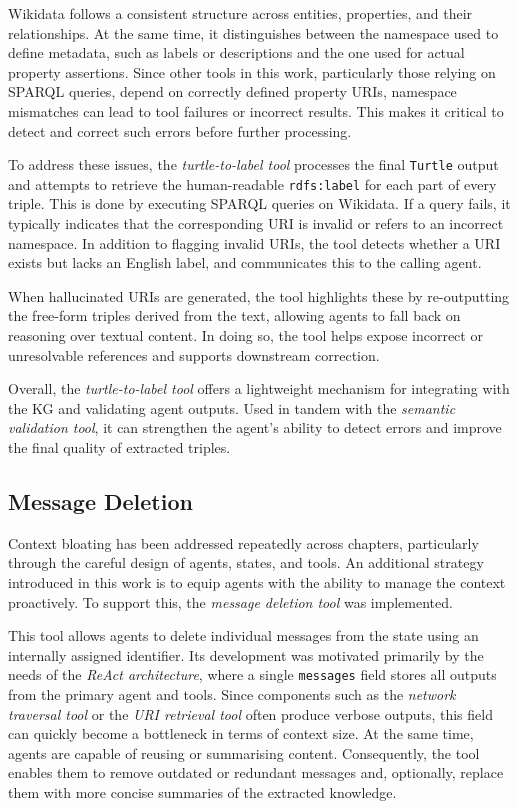 \documentclass[a4paper,oneside,bibliography=totoc]{scrbook}
\begin{document}
Wikidata follows a consistent structure across entities, properties, and their relationships. At the same time, it distinguishes between the namespace used to define metadata, such as labels or descriptions and the one used for actual property assertions. Since other tools in this work, particularly those relying on \ac{SPARQL} queries, depend on correctly defined property \acp{URI}, namespace mismatches can lead to tool failures or incorrect results. This makes it critical to detect and correct such errors before further processing.

To address these issues, the \textit{turtle-to-label tool} processes the final \texttt{Turtle} output and attempts to retrieve the human-readable \texttt{rdfs:label} for each part of every triple. This is done by executing \ac{SPARQL} queries on Wikidata. If a query fails, it typically indicates that the corresponding \ac{URI} is invalid or refers to an incorrect namespace. In addition to flagging invalid \acp{URI}, the tool detects whether a \ac{URI} exists but lacks an English label, and communicates this to the calling agent.

When hallucinated \acp{URI} are generated, the tool highlights these by re-outputting the free-form triples derived from the text, allowing agents to fall back on reasoning over textual content. In doing so, the tool helps expose incorrect or unresolvable references and supports downstream correction.

Overall, the \textit{turtle-to-label tool} offers a lightweight mechanism for integrating with the \ac{KG} and validating agent outputs. Used in tandem with the \textit{semantic validation tool}, it can strengthen the agent's ability to detect errors and improve the final quality of extracted triples.

\subsection{Message Deletion}
\label{subsec:message_deletion}

Context bloating has been addressed repeatedly across chapters, particularly through the careful design of agents, states, and tools. An additional strategy introduced in this work is to equip agents with the ability to manage the context proactively. To support this, the \textit{message deletion tool} was implemented.

This tool allows agents to delete individual messages from the state using an internally assigned identifier. Its development was motivated primarily by the needs of the \textit{\ac{ReAct} architecture}, where a single \texttt{messages} field stores all outputs from the primary agent and tools. Since components such as the \textit{network traversal tool} or the \textit{\ac{URI} retrieval tool} often produce verbose outputs, this field can quickly become a bottleneck in terms of context size. At the same time, agents are capable of reusing or summarising content. Consequently, the tool enables them to remove outdated or redundant messages and, optionally, replace them with more concise summaries of the extracted knowledge.
\end{document}
